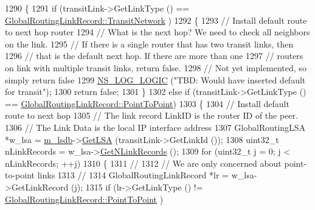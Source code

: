 \begin{DoxyCode}
1290     \{
1291       \textcolor{keywordflow}{if} (transitLink->GetLinkType () == \hyperlink{classns3_1_1GlobalRoutingLinkRecord_a9380bcce9bca03943c4761b166a694f4ad3d00014c9ba50539a53b55fce117856}{GlobalRoutingLinkRecord::TransitNetwork}
      )
1292         \{
1293           \textcolor{comment}{// Install default route to next hop router}
1294           \textcolor{comment}{// What is the next hop?  We need to check all neighbors on the link.}
1295           \textcolor{comment}{// If there is a single router that has two transit links, then}
1296           \textcolor{comment}{// that is the default next hop.  If there are more than one}
1297           \textcolor{comment}{// routers on link with multiple transit links, return false.}
1298           \textcolor{comment}{// Not yet implemented, so simply return false}
1299           \hyperlink{group__logging_ga88acd260151caf2db9c0fc84997f45ce}{NS\_LOG\_LOGIC} (\textcolor{stringliteral}{"TBD: Would have inserted default for transit"});
1300           \textcolor{keywordflow}{return} \textcolor{keyword}{false};
1301         \}
1302       \textcolor{keywordflow}{else} \textcolor{keywordflow}{if} (transitLink->GetLinkType () == 
      \hyperlink{classns3_1_1GlobalRoutingLinkRecord_a9380bcce9bca03943c4761b166a694f4aa345c79cdcaba957f5e8296509183912}{GlobalRoutingLinkRecord::PointToPoint})
1303         \{
1304           \textcolor{comment}{// Install default route to next hop}
1305           \textcolor{comment}{// The link record LinkID is the router ID of the peer.}
1306           \textcolor{comment}{// The Link Data is the local IP interface address}
1307           GlobalRoutingLSA *w\_lsa = \hyperlink{classns3_1_1GlobalRouteManagerImpl_a7e528f818fa3e6c794b07c0b3cba5f61}{m\_lsdb}->\hyperlink{classns3_1_1GlobalRouteManagerLSDB_a3504bf3573cc64a056835684c41e1aa5}{GetLSA} (transitLink->GetLinkId ());
1308           uint32\_t nLinkRecords = w\_lsa->\hyperlink{classns3_1_1GlobalRoutingLSA_a49043980a9d54ce4125cab4dbdba5a5c}{GetNLinkRecords} ();
1309           \textcolor{keywordflow}{for} (uint32\_t j = 0; j < nLinkRecords; ++j)
1310             \{
1311               \textcolor{comment}{//}
1312               \textcolor{comment}{// We are only concerned about point-to-point links}
1313               \textcolor{comment}{//}
1314               GlobalRoutingLinkRecord *lr = w\_lsa->GetLinkRecord (j);
1315               \textcolor{keywordflow}{if} (lr->GetLinkType () != \hyperlink{classns3_1_1GlobalRoutingLinkRecord_a9380bcce9bca03943c4761b166a694f4aa345c79cdcaba957f5e8296509183912}{GlobalRoutingLinkRecord::PointToPoint}
      )

\end{DoxyCode}

